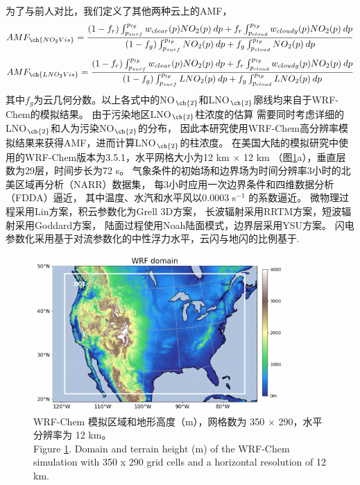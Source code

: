 为了与前人对比，我们定义了其他两种云上的AMF，
\begin{equation} \label{eq:AMF_NO2Vis}
AMF_{\ch{NO_2Vis}} = \frac{(1-f_r) \int_{p_{surf}}^{p_{tp}} w_{clear}(p) NO_2(p) \: dp + f_r \int_{p_{cloud}}^{p_{tp}} w_{cloudy}(p) NO_2(p) \: dp}{(1-f_g) \int_{p_{surf}}^{p_{tp}} NO_2(p) \: dp + f_g \int_{p_{cloud}}^{p_{tp}} NO_2(p) \: dp}
\end{equation}
\begin{equation} \label{eq:AMF_LNO2Vis}
AMF_{\ch{LNO_2Vis}} = \frac{(1-f_r) \int_{p_{surf}}^{p_{tp}} w_{clear}(p) NO_2(p) \: dp + f_r \int_{p_{cloud}}^{p_{tp}} w_{cloudy}(p) NO_2(p) \: dp}{(1-f_g) \int_{p_{surf}}^{p_{tp}} LNO_2(p) \: dp + f_g \int_{p_{cloud}}^{p_{tp}} LNO_2(p) \: dp}
\end{equation}
其中$f_g$为云几何分数。以上各式中的NO$_{\ch{2}}$和LNO$_{\ch{2}}$廓线均来自于WRF-Chem的模拟结果。
由于污染地区LNO$_{\ch{2}}$柱浓度的估算
需要同时考虑详细的LNO$_{\ch{2}}$和人为污染NO$_{\ch{2}}$的分布，
因此本研究使用WRF-Chem高分辨率模拟结果来获得AMF，进而计算LNO$_{\ch{2}}$的柱浓度。
在美国大陆的模拟研究中使用的WRF-Chem版本为3.5.1，水平网格大小为12 km $\times$ 12 km （图\ref{fig:us_domain}a），垂直层数为29层，时间步长为72 s。
气象条件的初始场和边界场为时间分辨率3小时的北美区域再分析（NARR）数据集，
每3小时应用一次边界条件和四维数据分析（FDDA）逼近，
其中温度、水汽和水平风以0.0003 s$^{-1}$ 的系数逼近\citep{Laughner.2017}。
微物理过程采用Lin方案\citep{Lin.1983}，积云参数化为Grell 3D方案\citep{Grell.1993a,Grell.2002a}，
长波辐射采用RRTM方案\citep{Iacono.2008}，短波辐射采用Goddard方案，
陆面过程使用Noah陆面模式\citep{Koren.1999}，边界层采用YSU方案\citep{Hong.2006}。
闪电参数化采用基于对流参数化的中性浮力水平\citep{Pickering.1992}，云闪与地闪的比例基于\citet{Boccippio.2001}.

\begin{figure}[H]
\centering
\includegraphics[width=0.85\textwidth]{./figures/us_domain.png}
\caption{WRF-Chem 模拟区域和地形高度（m），网格数为 350 $\times$ 290，水平分辨率为 12 km。 \\
Figure \ref{fig:us_domain}. Domain and terrain height (m) of the WRF-Chem simulation with 350 x 290 grid cells and a horizontal resolution of 12 km.}
\label{fig:us_domain}
\end{figure}


